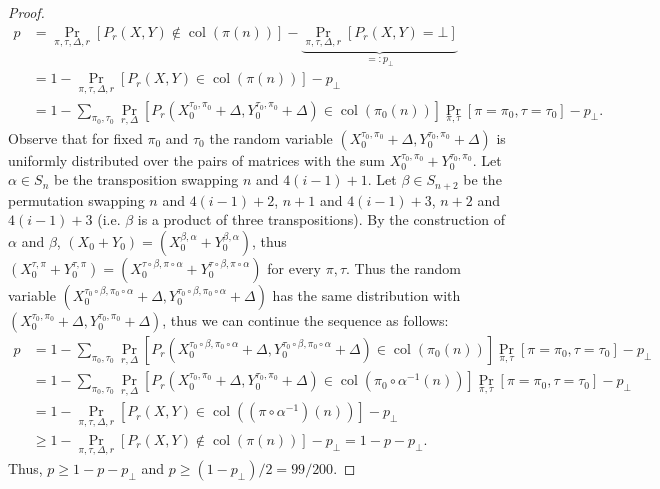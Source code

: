 \documentclass[10pt,a4paper]{article}
\begin{document}
\begin{proof}
\begin{align*}
p&=\Pr_{\pi,\tau,\Delta,r}[P_r(X,Y)\notin\operatorname{col}(\pi(n))]
-\underbrace{\Pr_{\pi,\tau,\Delta,r}[P_r(X,Y)=\bot]}_{=:p_\bot}\\
&=1-\Pr_{\pi,\tau,\Delta,r}[P_r(X,Y)\in\operatorname{col}(\pi(n))]-p_\bot\\
&=1-\sum_{\pi_0,\tau_0}\Pr_{r,\Delta}[P_r(X_0^{\tau_0,\pi_0}+\Delta,Y_0^{\tau_0,\pi_0}+\Delta)\in\operatorname{col}(\pi_0(n))]
\Pr_{\pi,\tau}[\pi=\pi_0,\tau=\tau_0]-p_\bot .
\end{align*}
Observe that for fixed $\pi_0$ and $\tau_0$ the random variable $(X_0^{\tau_0,\pi_0}+\Delta,Y_0^{\tau_0,\pi_0}+\Delta)$ is uniformly distributed over the pairs of matrices with the sum $X_0^{\tau_0,\pi_0}+Y_0^{\tau_0,\pi_0}$. Let $\alpha\in S_n$ be the transposition swapping $n$ and $4(i-1)+1$. Let $\beta\in S_{n+2}$ be the permutation swapping $n$ and $4(i-1)+2$, $n+1$ and $4(i-1)+3$, $n+2$ and $4(i-1)+3$ (i.e. $\beta$ is a product of three transpositions). By the construction of $\alpha$ and $\beta$, $(X_0+Y_0)=(X_0^{\beta,\alpha}+Y_0^{\beta,\alpha})$, thus $(X_0^{\tau,\pi}+Y_0^{\tau,\pi})=(X_0^{\tau\circ\beta,\pi\circ\alpha}+Y_0^{\tau\circ\beta,\pi\circ\alpha})$ for every $\pi,\tau$. Thus the random variable $(X_0^{\tau_0\circ\beta,\pi_0\circ\alpha}+\Delta,Y_0^{\tau_0\circ\beta,\pi_0\circ\alpha}+\Delta)$ has the same distribution with $(X_0^{\tau_0,\pi_0}+\Delta,Y_0^{\tau_0,\pi_0}+\Delta)$, thus we can continue the sequence as follows:
\begin{align*}
p&=1-\sum_{\pi_0,\tau_0}\Pr_{r,\Delta}[P_r(X_0^{\tau_0\circ\beta,\pi_0\circ\alpha}+\Delta,Y_0^{\tau_0\circ\beta,\pi_0\circ\alpha}+\Delta)\in\operatorname{col}(\pi_0(n))]\Pr_{\pi,\tau}[\pi=\pi_0,\tau=\tau_0]-p_\bot\\
&=1-\sum_{\pi_0,\tau_0}\Pr_{r,\Delta}[P_r(X_0^{\tau_0,\pi_0}+\Delta,Y_0^{\tau_0,\pi_0}+\Delta)\in\operatorname{col}(\pi_0\circ\alpha^{-1}(n))]\Pr_{\pi,\tau}[\pi=\pi_0,\tau=\tau_0]-p_\bot\\
&=1-\Pr_{\pi,\tau,\Delta,r}[P_r(X,Y)\in\operatorname{col}((\pi\circ\alpha^{-1})(n))]-p_\bot\\
&\ge1-\Pr_{\pi,\tau,\Delta,r}[P_r(X,Y)\notin\operatorname{col}(\pi(n))]-p_\bot=1-p-p_\bot .
\end{align*}
Thus, $p\ge1-p-p_\bot$ and $p\ge(1-p_\bot)/2=99/200$.
\end{proof}
\end{document}
